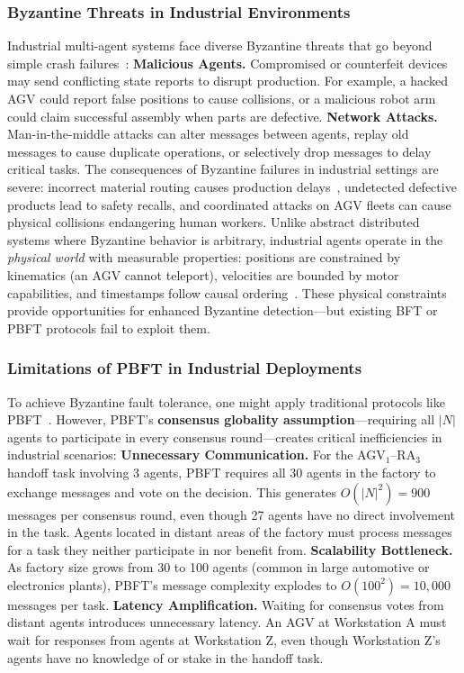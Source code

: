 \documentclass[lettersize,journal]{IEEEtran}
\begin{document}
\subsubsection{Byzantine Threats in Industrial Environments}
Industrial multi-agent systems face diverse Byzantine threats that go beyond simple crash failures~\cite{bhamare2020cybersecurity}:
\textbf{Malicious Agents.} Compromised or counterfeit devices may send conflicting state reports to disrupt production. For example, a hacked AGV could report false positions to cause collisions, or a malicious robot arm could claim successful assembly when parts are defective.
\textbf{Network Attacks.} Man-in-the-middle attacks can alter messages between agents, replay old messages to cause duplicate operations, or selectively drop messages to delay critical tasks.
The consequences of Byzantine failures in industrial settings are severe: incorrect material routing causes production delays~\cite{margret2024blockchain}, undetected defective products lead to safety recalls, and coordinated attacks on AGV fleets can cause physical collisions endangering human workers.
Unlike abstract distributed systems where Byzantine behavior is arbitrary, industrial agents operate in the \textit{physical world} with measurable properties: positions are constrained by kinematics (an AGV cannot teleport), velocities are bounded by motor capabilities, and timestamps follow causal ordering~\cite{li2022byzantine}. These physical constraints provide opportunities for enhanced Byzantine detection—but existing BFT or PBFT protocols fail to exploit them.

\subsubsection{Limitations of PBFT in Industrial Deployments}
To achieve Byzantine fault tolerance, one might apply traditional protocols like PBFT~\cite{li2022byzantine}. However, PBFT's \textbf{consensus globality assumption}—requiring all $|N|$ agents to participate in every consensus round—creates critical inefficiencies in industrial scenarios:
\textbf{Unnecessary Communication.} For the AGV$_1$--RA$_3$ handoff task involving 3 agents, PBFT requires all 30 
agents in the factory to exchange messages and vote on the decision. This generates $O(|N|^2) = 900$ messages per consensus round, even though 27 agents have no direct involvement in the task. Agents located in distant areas of the factory must process messages for a task they neither participate in nor benefit from.
\textbf{Scalability Bottleneck.} As factory size grows from 30 to 100 agents (common in large automotive or 
electronics plants), PBFT's message complexity explodes to $O(100^2) = 10,000$ messages per task.
\textbf{Latency Amplification.} Waiting for consensus votes from distant agents introduces unnecessary latency. An AGV at Workstation A must wait for responses from agents at Workstation Z, even though Workstation Z's agents have no knowledge of or stake in the handoff task.
\end{document}

